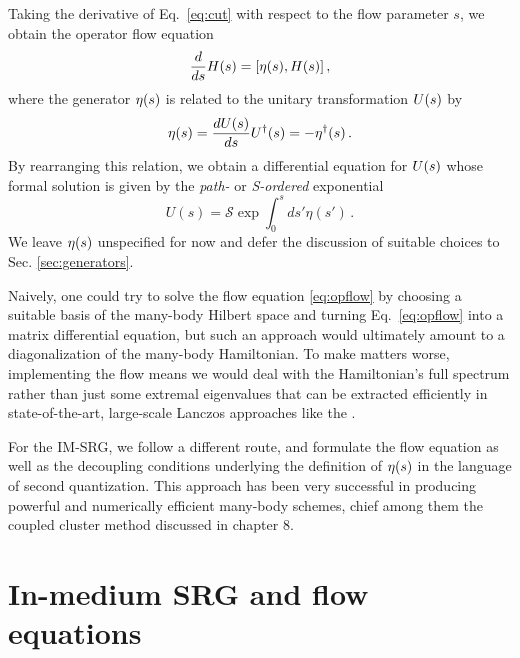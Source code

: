 Taking the derivative of Eq.~\eqref{eq:cut}
with respect to the flow parameter $s$, we obtain the operator flow equation
\begin{equation}\label{eq:opflow}
  \totd{}{s}\HO(s) = \comm{\etaO(s)}{\HO(s)}\,,
\end{equation} 
where the generator $\eta(s)$ is related to the unitary transformation $U(s)$ by
\begin{equation}
  \eta(s)= \frac{d {U(s)}} {d {s}} U^{\dag}(s) = -\eta^{\dag}(s)\,.
\end{equation}
By rearranging this relation, we obtain a differential equation for $U(s)$ whose formal solution is given by the \emph{path-}
or \emph{S-ordered} exponential
\begin{equation}
  U(s) = \mathcal{S}\exp \int^s_0 ds' \eta(s')\,.
\end{equation}
We leave $\eta(s)$ unspecified for now and defer the discussion of suitable choices to Sec. \ref{sec:generators}. 

Naively, one could try to solve the flow equation \eqref{eq:opflow} by
choosing a suitable basis of the many-body Hilbert space and turning
Eq.~\eqref{eq:opflow} into a matrix differential equation, but such an
approach would ultimately amount to a diagonalization of the many-body
Hamiltonian. To make matters worse, implementing the flow means we
would deal with the Hamiltonian's full spectrum rather than just some
extremal eigenvalues that can be extracted efficiently in
state-of-the-art, large-scale Lanczos approaches like the 
\cite{Navratil:2000hf,Barrett:2013oq}.

For the IM-SRG, we follow a different route, and formulate the flow equation as well as the decoupling conditions underlying the definition of $\eta(s)$ in the language of second quantization. This approach has been very successful in producing powerful and numerically efficient many-body schemes, chief among them the coupled cluster method discussed in chapter 8.

\section{In-medium SRG and flow equations}

